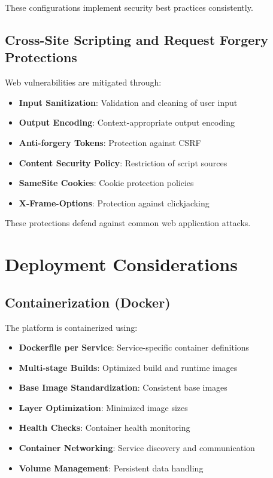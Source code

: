 These configurations implement security best practices consistently.

\subsection{Cross-Site Scripting and Request Forgery Protections}
Web vulnerabilities are mitigated through:
\begin{itemize}
    \item \textbf{Input Sanitization}: Validation and cleaning of user input
    \item \textbf{Output Encoding}: Context-appropriate output encoding
    \item \textbf{Anti-forgery Tokens}: Protection against CSRF
    \item \textbf{Content Security Policy}: Restriction of script sources
    \item \textbf{SameSite Cookies}: Cookie protection policies
    \item \textbf{X-Frame-Options}: Protection against clickjacking
\end{itemize}

These protections defend against common web application attacks.

\section{Deployment Considerations}

\subsection{Containerization (Docker)}
The platform is containerized using:
\begin{itemize}
    \item \textbf{Dockerfile per Service}: Service-specific container definitions
    \item \textbf{Multi-stage Builds}: Optimized build and runtime images
    \item \textbf{Base Image Standardization}: Consistent base images
    \item \textbf{Layer Optimization}: Minimized image sizes
    \item \textbf{Health Checks}: Container health monitoring
    \item \textbf{Container Networking}: Service discovery and communication
    \item \textbf{Volume Management}: Persistent data handling
\end{itemize}

